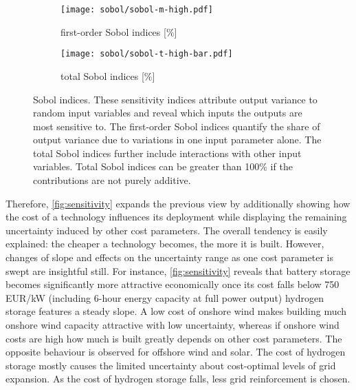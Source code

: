 \begin{figure}
    \begin{subfigure}[t]{0.45\textwidth}
        \caption{first-order Sobol indices [\%]}
        \label{fig:sobol:first}
        \texttt{[image: sobol/sobol-m-high.pdf]}
    \end{subfigure}
    \begin{subfigure}[t]{0.54\textwidth}
        \caption{total Sobol indices [\%]}
        \label{fig:sobol:total}
        \texttt{[image: sobol/sobol-t-high-bar.pdf]}
    \end{subfigure}
    \vspace{-0.3cm}
    \caption[First-order and total Sobol indices]{
      Sobol indices. These sensitivity indices attribute output variance to random input variables
      and reveal which inputs the outputs are most sensitive to. The first-order Sobol indices
      quantify the share of output variance due to variations in one input parameter alone.
      The total Sobol indices further include interactions with other input variables.
      Total Sobol indices can be greater than 100\% if the contributions are not purely additive.
    }
    \label{fig:sobol}
\end{figure}


Therefore, \cref{fig:sensitivity} expands the previous view by additionally
showing how the cost of a technology influences its deployment while displaying
the remaining uncertainty induced by other cost parameters. The overall tendency
is easily explained: the cheaper a technology becomes, the more it is built.
However, changes of slope and effects on the uncertainty range as one cost
parameter is swept are insightful still. For instance, \cref{fig:sensitivity}
reveals that battery storage becomes significantly more attractive economically
once its cost falls below 750 EUR/kW (including 6-hour energy capacity at full
power output) hydrogen storage features a steady slope. A low cost of onshore
wind makes building much onshore wind capacity attractive with low uncertainty,
whereas if onshore wind costs are high how much is built greatly depends on
other cost parameters. The opposite behaviour is observed for offshore wind and
solar. The cost of hydrogen storage mostly causes the limited uncertainty about
cost-optimal levels of grid expansion. As the cost of hydrogen storage falls,
less grid reinforcement is chosen.

